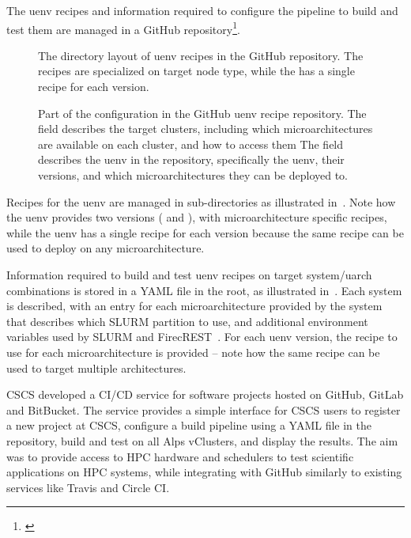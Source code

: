 
The uenv recipes and information required to configure the pipeline to build and test them are managed in a GitHub repository\footnote{\href{https://github.com/eth-cscs/alps-uenv}{}}.
\begin{figure}[htp!]
    
    \caption{The directory layout of uenv recipes in the GitHub repository. The  recipes are specialized on target node type, while the  has a single recipe for each version.}
    \label{fig:gh-recipe-path}
\end{figure}
\begin{figure}[htp!]
    
    \caption{Part of the configuration in the GitHub uenv recipe repository.
    The  field describes the target clusters, including which microarchitectures are available on each cluster, and how to access them
    The  field describes the uenv in the repository, specifically the uenv, their versions, and which microarchitectures they can be deployed to.
    }
    \label{fig:gh-config}
\end{figure}
Recipes for the uenv are managed in sub-directories as illustrated in~.
Note how the  uenv provides two versions ( and ), with microarchitecture specific recipes, while the  uenv has a single recipe for each version because the same recipe can be used to deploy on any microarchitecture.

Information required to build and test uenv recipes on target system/uarch combinations is stored in a YAML file in the root, as illustrated in~.
Each system is described, with an entry for each microarchitecture provided by the system that describes which SLURM partition to use, and additional environment variables used by SLURM and FirecREST~\cite{f7t2019}.
For each uenv version, the recipe to use for each microarchitecture is provided -- note how the same recipe can be used to target multiple architectures.


CSCS developed a CI/CD service for software projects hosted on GitHub, GitLab and BitBucket.
The service provides a simple interface for CSCS users to register a new project at CSCS, configure a build pipeline using a YAML file in the repository, build and test on all Alps vClusters, and display the results.
The aim was to provide access to HPC hardware and schedulers to test scientific applications on HPC systems, while integrating with GitHub similarly to existing services like Travis and Circle CI.

